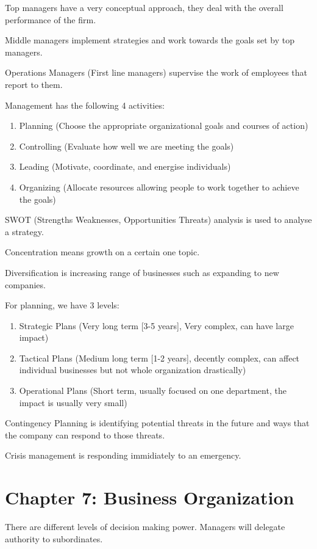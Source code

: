 \documentclass[12pt,letterpaper]{article} \usepackage{amsmath} \usepackage{graphicx} \usepackage[margin=1in]{geometry} \usepackage{longtable}  \usepackage{amssymb}
\begin{document}
		Top managers have a very conceptual approach, they deal with the overall performance of the firm.
		
		Middle managers implement strategies and work towards the goals set by top managers.
		
		Operations Managers (First line managers) supervise the work of employees that report to them.
		
		Management has the following 4 activities:
		\begin{enumerate}[noitemsep]
			\item Planning (Choose the appropriate organizational goals and courses of action)
			\item Controlling (Evaluate how well we are meeting the goals)
			\item Leading (Motivate, coordinate, and energise individuals)
			\item Organizing (Allocate resources allowing people to work together to achieve the goals)
		\end{enumerate}
	
		SWOT (Strengths Weaknesses, Opportunities Threats) analysis is used to analyse a strategy.
		
		Concentration means growth on a certain one topic. 
		
		Diversification is increasing range of businesses such as expanding to new companies. 
		
		For planning, we have 3 levels:
		\begin{enumerate}[noitemsep]
			\item Strategic Plans (Very long term [3-5 years], Very complex, can have large impact)
			\item Tactical Plans (Medium long term [1-2 years], decently complex, can affect individual businesses but not whole organization drastically)
			\item Operational Plans (Short term, usually focused on one department, the impact is usually very small)
		\end{enumerate}
	
		Contingency Planning is identifying potential threats in the future and ways that the company can respond to those threats.
		
		Crisis management is responding immidiately to an emergency.
		
		\section{Chapter 7: Business Organization}
		There are different levels of decision making power. Managers will delegate authority to subordinates. 
		
\end{document}
